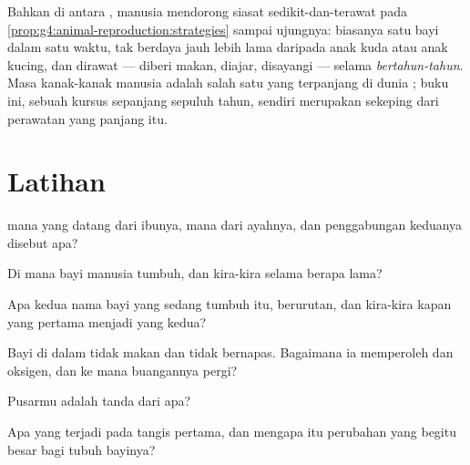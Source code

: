 \begin{example}\label{ex:g5:human-reproduction:longcare}
Bahkan di antara , manusia mendorong siasat sedikit-dan-terawat
pada \cref{prop:g4:animal-reproduction:strategies} sampai ujungnya:
biasanya satu bayi dalam satu waktu, tak berdaya jauh lebih lama
daripada anak kuda atau anak kucing, dan dirawat --- diberi makan,
diajar, disayangi --- selama \emph{bertahun-tahun}. Masa kanak-kanak manusia
adalah salah satu yang terpanjang di dunia ; buku ini, sebuah
kursus sepanjang sepuluh tahun, sendiri merupakan sekeping dari
perawatan yang panjang itu.
\end{example}

\section{Latihan}

\begin{exercise}[$\star$]\label{exo:g5:human-reproduction:1}
 mana yang datang dari ibunya, mana dari ayahnya, dan penggabungan
keduanya disebut apa?
\end{exercise}

\begin{exercise}[$\star$]\label{exo:g5:human-reproduction:2}
Di mana bayi manusia tumbuh, dan kira-kira selama berapa lama?
\end{exercise}

\begin{exercise}[$\star$]\label{exo:g5:human-reproduction:3}
Apa kedua nama bayi yang sedang tumbuh itu, berurutan, dan kira-kira
kapan yang pertama menjadi yang kedua?
\end{exercise}

\begin{exercise}[$\star$]\label{exo:g5:human-reproduction:4}
Bayi di dalam  tidak makan dan tidak bernapas. Bagaimana ia
memperoleh  dan oksigen, dan ke mana buangannya pergi?
\end{exercise}

\begin{exercise}[$\star$]\label{exo:g5:human-reproduction:5}
Pusarmu adalah tanda dari apa?
\end{exercise}

\begin{exercise}[$\star$]\label{exo:g5:human-reproduction:6}
Apa yang terjadi pada tangis pertama, dan mengapa itu perubahan yang
begitu besar bagi tubuh bayinya?
\end{exercise}

